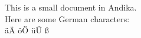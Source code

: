 \documentclass{article}
\begin{document}
This is a small document in Andika.
\\
Here are some German characters:
\\
äÄ öÖ üÜ ß
\end{document}

